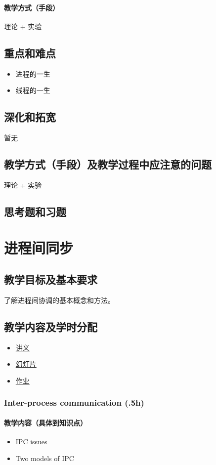 \documentclass[11pt]{article}
\begin{document}
\paragraph{教学方式（手段）}
\label{sec-2-2-11-2}
理论 + 实验
\subsection{重点和难点}
\label{sec-2-3}
\begin{itemize}
\item 进程的一生
\item 线程的一生
\end{itemize}
\subsection{深化和拓宽}
\label{sec-2-4}
暂无
\subsection{教学方式（手段）及教学过程中应注意的问题}
\label{sec-2-5}
理论 + 实验
\subsection{思考题和习题}
\label{sec-2-6}
\section{进程间同步}
\label{sec-3}
\subsection{教学目标及基本要求}
\label{sec-3-1}
了解进程间协调的基本概念和方法。
\subsection{教学内容及学时分配}
\label{sec-3-2}
\begin{itemize}
\item \href{./slides/process-sync-a.pdf}{讲义}
\item \href{./slides/process-sync-b.pdf}{幻灯片}
\item \href{./lab.html#sec-4-3}{作业}
\end{itemize}
\subsubsection{Inter-process communication (.5h)}
\label{sec-3-2-1}
\paragraph{教学内容（具体到知识点）}
\label{sec-3-2-1-1}
\begin{itemize}
\item IPC issues
\item Two models of IPC
\end{itemize}
\end{document}
